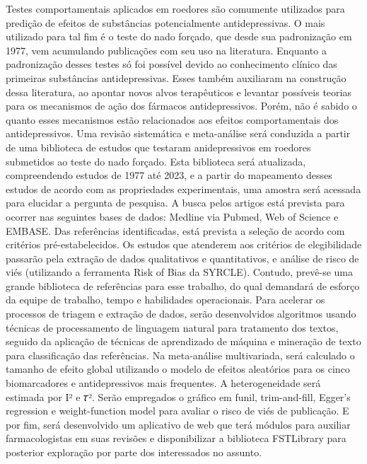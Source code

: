 \singlespacing
\noindent 
Testes comportamentais aplicados em roedores são comumente utilizados para predição de efeitos de substâncias potencialmente antidepressivas. O mais utilizado para tal fim é o teste do nado forçado, que desde sua padronização em 1977, vem acumulando publicações com seu uso na literatura. Enquanto a padronização desses testes só foi possível devido ao conhecimento clínico das primeiras substâncias antidepressivas. Esses também auxiliaram na construção dessa literatura, ao apontar novos alvos terapêuticos e levantar possíveis teorias para os mecanismos de ação dos fármacos antidepressivos. Porém, não é sabido o quanto esses mecanismos estão relacionados aos efeitos comportamentais dos antidepressivos. Uma revisão sistemática e meta-análise será conduzida a partir de uma biblioteca de estudos que testaram anidepressivos em roedores submetidos ao teste do nado forçado. Esta biblioteca será atualizada, compreendendo estudos de 1977 até 2023, e a partir do mapeamento desses estudos de acordo com as propriedades experimentais, uma amostra será acessada para elucidar a pergunta de pesquisa. A busca pelos artigos está prevista para ocorrer nas seguintes bases de dados: Medline via Pubmed, Web of Science e EMBASE. Das referências identificadas, está prevista a seleção de acordo com critérios pré-estabelecidos. Os estudos que atenderem aos critérios de elegibilidade passarão pela extração de dados qualitativos e quantitativos, e análise de risco de viés (utilizando a ferramenta Risk of Bias da SYRCLE). Contudo, prevê-se uma grande biblioteca de referências para esse trabalho, do qual demandará de esforço da equipe de trabalho, tempo e habilidades operacionais. Para acelerar os processos de triagem e extração de dados, serão desenvolvidos algoritmos usando técnicas de processamento de linguagem natural para tratamento dos textos, seguido da aplicação de técnicas de aprendizado de máquina e mineração de texto para classificação das referências. Na meta-análise multivariada, será calculado o tamanho de efeito global utilizando o modelo de efeitos aleatórios para os cinco biomarcadores e antidepressivos mais frequentes. A heterogeneidade será estimada por I² e 𝜏². Serão empregados o gráfico em funil, trim-and-fill, Egger's regression e weight-function model para avaliar o risco de viés de publicação. E por fim, será desenvolvido um aplicativo de web que terá módulos para auxiliar farmacologistas em suas revisões e disponibilizar a biblioteca FSTLibrary para posterior exploração por parte dos interessados no assunto.

